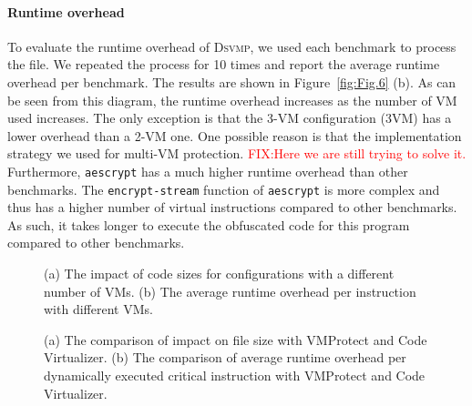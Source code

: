 \documentclass[conference]{IEEEtran}
\newcommand{\DSVMP}{\textsc{Dsvmp}\xspace}
\newcommand\FIXME[1]{\textcolor{red}{FIX:}\textcolor{red}{#1}}
\begin{document}
\paragraph*{Runtime overhead} To evaluate the runtime overhead of \DSVMP, we used each benchmark to process the file. We repeated the process for 10 times and report the average runtime overhead per benchmark. The results are shown in Figure~\ref{fig:Fig.6} (b).
As can be seen from this diagram, the runtime overhead increases as the number of VM used increases. The only exception is that the 3-VM configuration (3VM) has a lower overhead than a 2-VM one. One possible reason is that the implementation strategy we used for multi-VM protection. \FIXME{Here we are still trying to solve it.}
Furthermore, \texttt{aescrypt} has a much higher runtime overhead than other benchmarks. The \texttt{encrypt-stream} function of  \texttt{aescrypt} is  more complex and thus has a higher number of virtual instructions compared to other benchmarks. As such, it takes longer to execute the obfuscated code for this program compared to other benchmarks.

\begin{figure}[t]
\centering
{}
\caption{(a) The impact of code sizes for configurations with a different number of VMs. (b) The average runtime overhead per instruction with different VMs.}\label{fig:Fig.6}
\centering
{}
\caption{(a) The comparison of impact on file size with VMProtect and Code Virtualizer. (b) The comparison of average runtime overhead per dynamically executed critical instruction with VMProtect and Code Virtualizer.}\label{fig:Fig.7}
\vspace{-4mm}
\end{figure}
\end{document}
